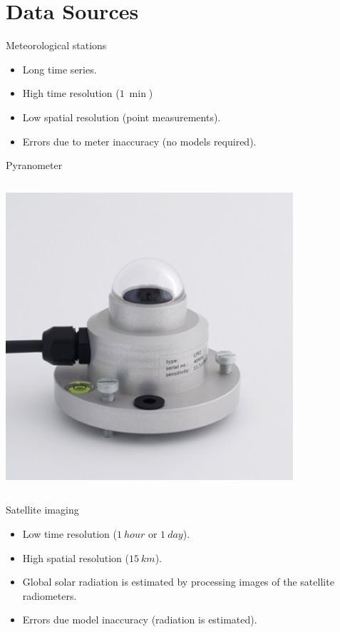 \documentclass[xcolor={usenames,svgnames,dvipsnames}]{beamer}
\begin{document}
\section{Data Sources}
\label{sec:org3f7af16}
\begin{frame}[label={sec:org2a628ea}]{Meteorological stations}
\begin{itemize}
\item Long time series.
\item High time resolution (\(\SI{1}{\min}\))
\item Low spatial resolution (point measurements).
\item Errors due to meter inaccuracy (no models required).
\end{itemize}

\begin{block}{Pyranometer}
\end{block}
\begin{columns}
\begin{column}{0.4\columnwidth}
\begin{center}
\begin{center}
\includegraphics[width=0.8\textwidth]{../figs/piranometro.jpg}
\end{center}
\end{center}
\end{column}
\end{columns}
\end{frame}


\begin{frame}[label={sec:org81dcadf}]{Satellite imaging}
\begin{itemize}
\item Low time resolution (\(\SI{1}{hour}\) or \(\SI{1}{day}\)).

\item High spatial resolution (\(\SI{15}{km}\)).

\item Global solar radiation is estimated by processing images of the satellite radiometers.

\item Errors due model inaccuracy (radiation is estimated).
\end{itemize}
\end{frame}
\end{document}
